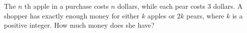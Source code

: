 The $ n $ th apple in a purchase costs $ n $ dollars, while each pear costs 3 dollars. A shopper has exactly enough money for either $ k $ apples or $ 2k $ pears, where $ k $ is a positive integer. How much money does she have?
